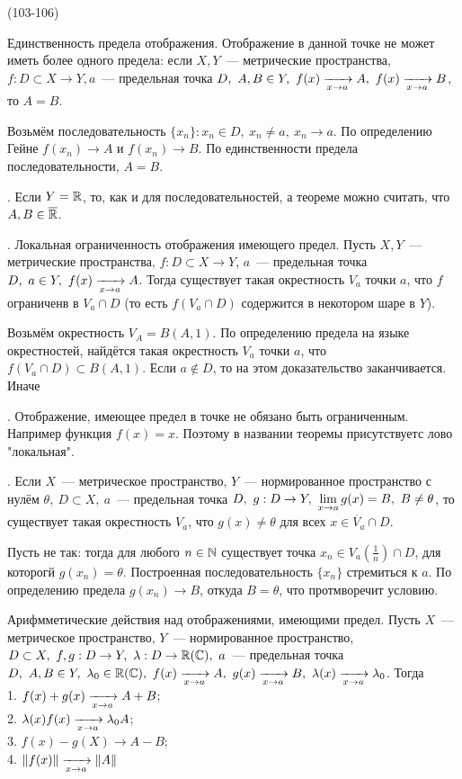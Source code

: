 (103-106)

\T \q Единственность предела отображения. Отображение в данной точке не может иметь более одного предела: если $X, Y$~--- метрические пространства, $f: D \subset X \to Y, a$~--- предельная точка $D,\ A, B \in Y,\ f(x)\t A,\ f(x)\t B$, то $A = B$.

\D Возьмём последовательность $\{x_n\}: x_n \in D,\ x_n \neq a,\ x_n \to a$. По определению Гейне $f(x_n)\to A$ и $f(x_n) \to B$. По единственности предела последовательности, $A = B$.

. Если $Y = \mathbb{R}$, то, как и для последовательностей, а теореме можно считать, что $A, B \in \overline{\mathbb{R}}$.

\T. \q Локальная ограниченность отображения имеющего предел. Пусть $X, Y$~--- метрические пространства, $f: D\subset X\to Y$, $a$~--- предельная точка $D,\ a\in Y,\ f(x)\xrightarrow[x\to a]{} A$. Тогда существует такая окрестность $V_a$ точки $a$, что $f$ ограниченв в $V_a\cap D$ (то есть $f(V_a \cap D)$ содержится в некотором шаре в $Y$).

\D Возьмём окрестность $V_A = B(A, 1)$. По определению предела на языке окрестностей, найдётся такая окрестность $V_a$ точки $a$, что $f(V_a \cap D) \subset B(A, 1)$. Если $a \notin D$, то на этом доказательство заканчивается. Иначе

. Отображение, имеющее предел в точке не обязано быть ограниченным. Например функция $f(x) = x$. Поэтому в названии теоремы присутствуетс лово "локальная".

. Если $X$~--- метрическое пространство, $Y$~--- нормированное пространство с нулём $\theta,\ D \subset X,\ a$~--- предельная точка $D,\ g: D\to Y,\ \dsl\lim{x\to a}{}g(x) = B,\ B \neq \theta$, то существует такая окрестность $V_a$, что $g(x) \neq \theta$ для всех $x \in \dot{V_a}\cap D$.

\D Пусть не так: тогда для любого $n \in \mathbb{N}$ существует точка $x_n \in V_a(\frac1n)\cap D$, для которогй $g(x_n) = \theta$. Построенная последовательность $\{x_n\}$ стремиться к $a$. По определению предела $g(x_n) \to B$, откуда $B = \theta$, что протмворечит условию.

\T \q Арифмметические действия над отображениями, имеющими предел. Пусть $X$~--- метрическое пространство, $Y$~--- нормированное пространство, $D \subset X,\ f, g: D \to Y,\ \lambda: D\to \mathbb{R}(\mathbb{C}),\ a$~--- предельная точка $D,\ A, B \in Y,\ \lambda_0 \in \R(\C),\ f(x) \t A,\ g(x)\t B,\ \lambda(x)\t \lambda_0$. Тогда \\
1. $f(x) + g(x) \xrightarrow[x\to a]{} A + B$;\\
2. $\lambda(x)f(x) \xrightarrow[x\to a]{} \lambda_0 A$;\\
3. $f(x) - g(X) \to A - B$;\\
4. $\|f(x)\| \xrightarrow[x\to a]{} \|A\|$

